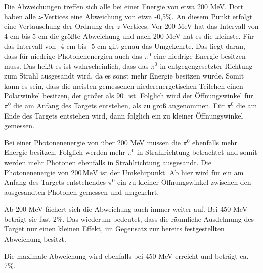 \documentclass[a4paper,11pt,oneside,final,german,openbib,pdftex]{scrbook}
\begin{document}
{Die Abweichungen treffen sich alle bei einer Energie von etwa 200 MeV. Dort haben alle $z$-Vertices eine Abweichung von etwa -0,5\%. An diesem Punkt erfolgt eine Vertauschung der Ordnung der $z$-Vertices. Vor 200 MeV hat das Intervall von 4 cm bis 5 cm die gr\"o{\ss}te Abweichung und nach 200 MeV hat es die kleinste. F\"ur das Intervall von -4 cm bis -5 cm gilt genau das Umgekehrte. Das liegt daran, dass f\"ur niedrige Photonenenergien auch das $\pi^0$ eine niedrige Energie besitzen muss. Das hei{\ss}t es ist wahrscheinlich, dass das $\pi^0$ in entgegengesetzter Richtung zum Strahl ausgesandt wird, da es sonst mehr Energie besitzen w\"urde. Somit kann es sein, dass die meisten gemessenen niederenergetischen Teilchen einen Polarwinkel besitzen, der gr\"o{\ss}er als 90$^{\circ}$ ist. Folglich wird der \"Offnungswinkel f\"ur $\pi^0$ die am Anfang des Targets entstehen, als zu gro{\ss} angenommen. F\"ur $\pi^0$ die am Ende des Targets entstehen wird, dann folglich ein zu kleiner \"Offnungswinkel gemessen. 

Bei einer Photonenenergie von \"uber 200 MeV m\"ussen die $\pi^0$ ebenfalls mehr Energie besitzen. Folglich werden mehr $\pi^0$ in Strahlrichtung betrachtet und somit werden mehr Photonen ebenfalls in Strahlrichtung ausgesandt. Die Photonenenergie von $200\, \text{MeV}$ ist der Umkehrpunkt.
Ab hier wird f\"ur ein am Anfang des Targets entstehendes $\pi^0$ ein zu kleiner \"Offnungswinkel zwischen den ausgesandten Photonen gemessen und umgekehrt.

Ab 200 MeV f\"achert sich die Abweichung auch immer weiter auf. Bei 450 MeV betr\"agt sie fast 2\%. Das wiederum bedeutet, dass die r\"aumliche Ausdehnung des Target nur einen kleinen Effekt, im Gegensatz zur bereits festgestellten Abweichung besitzt.

Die maximale Abweichung wird ebenfalls bei 450 MeV erreicht und betr\"agt ca. 7\%.

}
\end{document}

